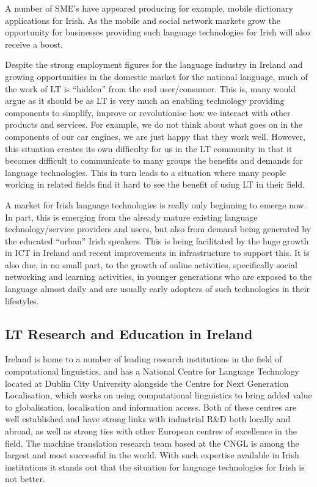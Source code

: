 \documentclass[]{../../metanetpaper}
\begin{document}
\begin{multicols}{2}
A number of SME's have appeared producing for example, mobile dictionary applications for Irish. As the mobile and social network markets grow the opportunity for businesses providing such language technologies for Irish will also receive a boost.

Despite the strong employment figures for the language industry in Ireland and growing opportunities in the domestic market for the national language, much of the work of LT is ``hidden'' from the end user/consumer. This is, many would argue as it should be as LT is very much an enabling technology providing components to simplify, improve or revolutionise how we interact with other products and services. For example, we do not think about what goes on in the components of our car engines, we are just happy that they work well. However, this situation creates its own difficulty for us in the LT community in that it becomes difficult to communicate to many groups the benefits and demands for language technologies. This in turn leads to a situation where many people working in related fields find it hard to see the benefit of using LT in their field.

A market for Irish language technologies is really only beginning to emerge now. In part, this is emerging from the already mature existing language technology/service providers and users, but also from demand being generated by the educated ``urban'' Irish speakers. This is being facilitated by the huge growth in ICT in Ireland and recent improvements in infrastructure to support this. It is also due, in no small part, to the growth of online activities, specifically social networking and learning activities, in younger generations who are exposed to the language almost daily and are usually early adopters of such technologies in their lifestyles.

\subsection{LT Research and Education in Ireland}

Ireland is home to a number of leading research institutions in the field of computational linguistics, and has a National Centre for Language Technology located at Dublin City University alongside the Centre for Next Generation Localisation, which works on using computational linguistics to bring added value to globalisation, localisation and information access. Both of these centres are well established and have strong links with industrial R\&D both locally and abroad, as well as strong ties with other European centres of excellence in the field. The machine translation research team based at the CNGL is among the largest and most successful in the world. With such expertise available in Irish institutions it stands out that the situation for language technologies for Irish is not better. 


\end{multicols}
\end{document}

